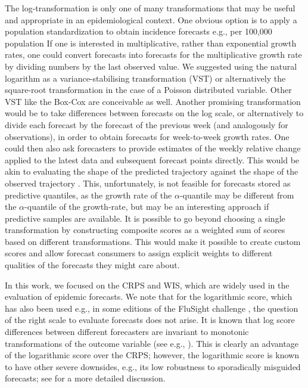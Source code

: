 \documentclass{article}
\begin{document}
The log-transformation is only one of many transformations that may be useful and appropriate in an epidemiological context. One obvious option is to apply a population standardization to obtain incidence forecasts e.g., per 100,000 population If one is interested in multiplicative, rather than exponential growth rates, one could convert forecasts into forecasts for the multiplicative growth rate by dividing numbers by the last observed value. We suggested using the natural logarithm as a variance-stabilising transformation (VST) or alternatively the square-root transformation in the case of a Poisson distributed variable. Other VST like the Box-Cox \citep{boxAnalysisTransformations1964} are conceivable as well. Another promising transformation would be to take differences between forecasts on the log scale, or alternatively to divide each forecast by the forecast of the previous week (and analogously for observations), in order to obtain forecasts for week-to-week growth rates. One could then also ask forecasters to provide estimates of the weekly relative change applied to the latest data and subsequent forecast points directly. This would be akin to evaluating the shape of the predicted trajectory against the shape of the observed trajectory \citep[for a different approach to evaluating the shape of a forecast, see][]{srivastavaShapebasedEvaluationEpidemic2022}. This, unfortunately, is not feasible for forecasts stored as predictive quantiles, as the growth rate of the $\alpha$-quantile may be different from the $\alpha$-quantile of the growth-rate, but may be an interesting approach if predictive samples are available. It is possible to go beyond choosing a single transformation by constructing composite scores as a weighted sum of scores based on different transformations. This would make it possible to create custom scores and allow forecast consumers to assign explicit weights to different qualities of the forecasts they might care about.

In this work, we focused on the CRPS and WIS, which are widely used in the evaluation of epidemic forecasts. We note that for the logarithmic score, which has also been used e.g., in some editions of the FluSight challenge \cite{reichCollaborativeMultiyearMultimodel2019}, the question of the right scale to evaluate forecasts does not arise. It is known that log score differences between different forecasters are invariant to monotonic transformations of the outcome variable (see e.g., \citealt{diksLikelihoodbasedScoringRules2011}). This is clearly an advantage of the logarithmic score over the CRPS; however, the logarithmic score is known to have other severe downsides, e.g., its low robustness to sporadically misguided forecasts; see \cite{bracherEvaluatingEpidemicForecasts2021} for a more detailed discussion.
\end{document}
